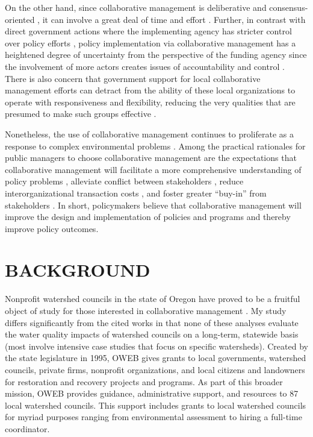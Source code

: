 \documentclass[12pt,a4paper,titlepage]{article}
\begin{document}
On the other hand, since collaborative management is deliberative and consensus-oriented \parencite{ansell2008}, it can involve a great deal of time and effort \parencite{margerum2011}. Further, in contrast with direct government actions where the implementing agency has stricter control over policy efforts \parencite{salamon2002}, policy implementation via collaborative management has a heightened degree of uncertainty from the perspective of the funding agency since the involvement of more actors creates issues of accountability and control \parencite{weber2003}. There is also concern that government support for local collaborative management efforts can detract from the ability of these local organizations to operate with responsiveness and flexibility, reducing the very qualities that are presumed to make such groups effective \parencite{smith2004,nikolic2008}.

Nonetheless, the use of collaborative management continues to proliferate \parencite{ansell2008,emerson2012} as a response to complex environmental problems \parencite{margerum2011}. Among the practical rationales for public managers to choose collaborative management are the expectations that collaborative management will facilitate a more comprehensive understanding of policy problems \parencite{leach2013}, alleviate conflict between stakeholders \parencite{berardo2014}, reduce interorganizational transaction costs \parencite{emerson2012}, and foster greater “buy-in” from stakeholders \parencite{ansell2008}. In short, policymakers believe that collaborative management will improve the design and implementation of policies and programs and thereby improve policy outcomes.

\section*{\bf\MakeUppercase{Background}}

Nonprofit watershed councils in the state of Oregon have proved to be a fruitful object of study for those interested in collaborative management \parencite{griffin1999,dakins2005,margerum2002,margerum2007,margerum2008,margerum2011,habron2003,margerum2004,hibbard2006, lurie2008}. My study differs significantly from the cited works in that none of these analyses evaluate the water quality impacts of watershed councils on a long-term, statewide basis (most involve intensive case studies that focus on specific watersheds). Created by the state legislature in 1995, OWEB gives grants to local governments, watershed councils, private firms, nonprofit organizations, and local citizens and landowners for restoration and recovery projects and programs. As part of this broader mission, OWEB provides guidance, administrative support, and resources to 87 local watershed councils. This support includes grants to local watershed councils for myriad purposes ranging from environmental assessment to hiring a full-time coordinator. 
\end{document}
